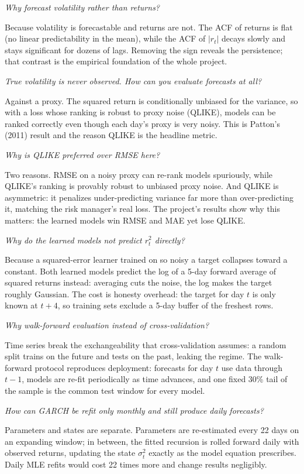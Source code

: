 \documentclass[a4paper,11pt]{article}
\newenvironment{qa}{\begin{description}[leftmargin=0pt,itemsep=6pt]}{\end{description}}
\newcommand{\Q}[1]{\item[Q.] \textit{#1}}
\newcommand{\A}{\item[A.]}
\begin{document}
\begin{qa}
\Q{Why forecast volatility rather than returns?}
\A Because volatility is forecastable and returns are not. The ACF of returns is flat (no linear predictability in the mean), while the ACF of $|r_t|$ decays slowly and stays significant for dozens of lags. Removing the sign reveals the persistence; that contrast is the empirical foundation of the whole project.

\Q{True volatility is never observed. How can you evaluate forecasts at all?}
\A Against a proxy. The squared return is conditionally unbiased for the variance, so with a loss whose ranking is robust to proxy noise (QLIKE), models can be ranked correctly even though each day's proxy is very noisy. This is Patton's (2011) result and the reason QLIKE is the headline metric.

\Q{Why is QLIKE preferred over RMSE here?}
\A Two reasons. RMSE on a noisy proxy can re-rank models spuriously, while QLIKE's ranking is provably robust to unbiased proxy noise. And QLIKE is asymmetric: it penalizes under-predicting variance far more than over-predicting it, matching the risk manager's real loss. The project's results show why this matters: the learned models win RMSE and MAE yet lose QLIKE.

\Q{Why do the learned models not predict $r_t^2$ directly?}
\A Because a squared-error learner trained on so noisy a target collapses toward a constant. Both learned models predict the log of a 5-day forward average of squared returns instead: averaging cuts the noise, the log makes the target roughly Gaussian. The cost is honesty overhead: the target for day $t$ is only known at $t+4$, so training sets exclude a 5-day buffer of the freshest rows.

\Q{Why walk-forward evaluation instead of cross-validation?}
\A Time series break the exchangeability that cross-validation assumes: a random split trains on the future and tests on the past, leaking the regime. The walk-forward protocol reproduces deployment: forecasts for day $t$ use data through $t-1$, models are re-fit periodically as time advances, and one fixed 30\% tail of the sample is the common test window for every model.

\Q{How can GARCH be refit only monthly and still produce daily forecasts?}
\A Parameters and states are separate. Parameters are re-estimated every 22 days on an expanding window; in between, the fitted recursion is rolled forward daily with observed returns, updating the state $\sigma_t^2$ exactly as the model equation prescribes. Daily MLE refits would cost 22 times more and change results negligibly.


\end{qa}
\end{document}

